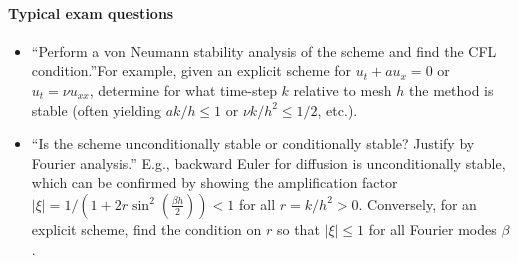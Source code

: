 \documentclass[a4paper,11pt]{report}
\begin{document}
\paragraph{Typical exam questions}
\begin{itemize}
    \item \enquote{Perform a von Neumann stability analysis of the scheme and find the CFL condition.}For example, given an explicit scheme for $u_t + au_x = 0$ or $u_t = \nu u_{xx}$, determine for what time-step $k$ relative to mesh $h$ the method is stable (often yielding $ak/h \le 1$ or $\nu k/h^2 \le 1/2$, etc.).
    \item \enquote{Is the scheme unconditionally stable or conditionally stable? Justify by Fourier analysis.} E.g., backward Euler for diffusion is unconditionally stable, which can be confirmed by showing the amplification factor $|\xi| = 1/(1+2r\sin^2(\frac{\beta h}{2})) < 1$ for all $r=k/h^2>0$. Conversely, for an explicit scheme, find the condition on $r$ so that $|\xi| \le 1$ for all Fourier modes $\beta$.
\end{itemize}
\end{document}
